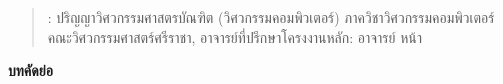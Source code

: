 \newpage
\begin{quote}
\thisYear:
ปริญญาวิศวกรรมศาสตรบัณฑิต (วิศวกรรมคอมพิวเตอร์) ภาควิชาวิศวกรรมคอมพิวเตอร์ คณะวิศวกรรมศาสตร์ศรีราชา,
อาจารย์ที่ปรึกษาโครงงานหลัก: อาจารย์
\pageref{LastPage} หน้า
\end{quote}
\vspace{0.2in}
\begin{center}
\textbf{\Huge บทคัดย่อ}
\end{center}
\vspace{0.3in}


\hspace{-0.5in}
